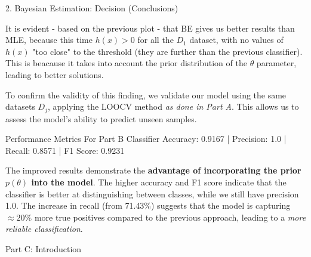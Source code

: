 \documentclass[aspectratio=169,xcolor=dvipsnames]{beamer}
\begin{document}
\begin{frame}{2. Bayesian Estimation: Decision (Conclusions)}

    It is evident - based on the previous plot - that BE gives us better results than MLE, because this time $h(x) > 0$ for all the $D_1$ dataset, with no values of $h(x)$ "too close" to the threshold (they are further than the previous classifier). This is beacause it takes into account the prior distribution of the $\theta$ parameter, leading to better solutions.

    \vspace{5pt}

    To confirm the validity of this finding, we validate our model using the same datasets $D_j$, applying the LOOCV method \textit{as done in Part A}. This allows us to assess the model's ability to predict unseen samples. 

    \begin{block}{Performance Metrics For Part B Classifier}
        Accuracy:  0.9167 |
        Precision: 1.0 |
        Recall:    0.8571 |
        F1 Score:  0.9231
    \end{block}

    The improved results demonstrate the \textbf{advantage of incorporating the prior $p(\theta)$ into the model}. The higher accuracy and F1 score indicate that the classifier is better at distinguishing between classes, while we still have precision 1.0. The increase in recall (from 71.43\%) suggests that the model is capturing  $\approx20\%$ more true positives compared to the previous approach, leading to a \textit{more reliable classification}.

\end{frame}

\begin{frame}{Part C: Introduction}
    
\end{frame}
\end{document}
